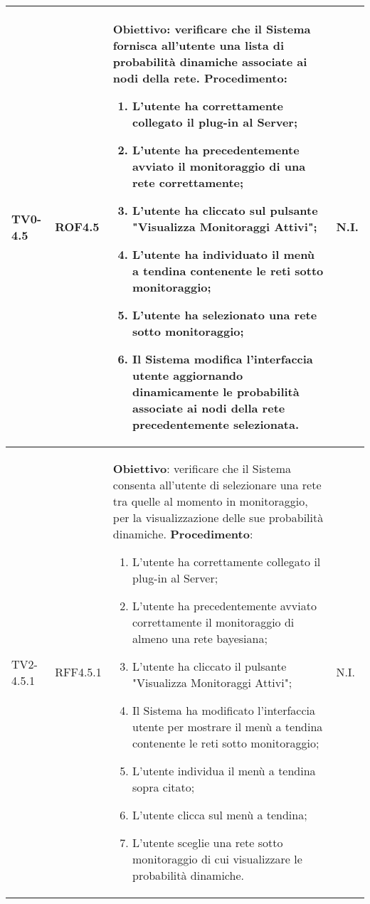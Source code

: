 \begin{longtable}{|C{.15\textwidth}|C{.13\textwidth}|m{.52\textwidth}|C{.08\textwidth}|}
TV0-4.5 & ROF4.5 &
	\textbf{Obiettivo}: verificare che il Sistema fornisca all'utente una lista di probabilità dinamiche associate ai nodi della rete. \newline
	\textbf{Procedimento}:
	\begin{enumerate}	
		\item L'utente ha correttamente collegato il plug-in al Server;
		\item L'utente ha precedentemente avviato il monitoraggio di una rete correttamente;
		\item L'utente ha cliccato sul pulsante "Visualizza Monitoraggi Attivi";
		\item L'utente ha individuato il menù a tendina contenente le reti sotto monitoraggio;
		\item L'utente ha selezionato una rete sotto monitoraggio;
		\item Il Sistema modifica l'interfaccia utente aggiornando dinamicamente le probabilità associate ai nodi della rete precedentemente selezionata.
	\end{enumerate}
	& N.I. \\
\hline

TV2-4.5.1 & RFF4.5.1 &
	\textbf{Obiettivo}: verificare che il Sistema consenta all'utente di selezionare una rete tra quelle al momento in monitoraggio, per la visualizzazione delle sue probabilità dinamiche. \newline
	\textbf{Procedimento}:
	\begin{enumerate}
		\item L'utente ha correttamente collegato il plug-in al Server;
		\item L'utente ha precedentemente avviato correttamente il monitoraggio di almeno una rete bayesiana;
		\item L'utente ha cliccato il pulsante "Visualizza Monitoraggi Attivi";
		\item Il Sistema ha modificato l'interfaccia utente per mostrare il menù a tendina contenente le reti sotto monitoraggio;
		\item L'utente individua il menù a tendina sopra citato;
		\item L'utente clicca sul menù a tendina;
		\item L'utente sceglie una rete sotto monitoraggio di cui visualizzare le probabilità dinamiche.
	\end{enumerate}
	& N.I. \\
\hline


\end{longtable}
